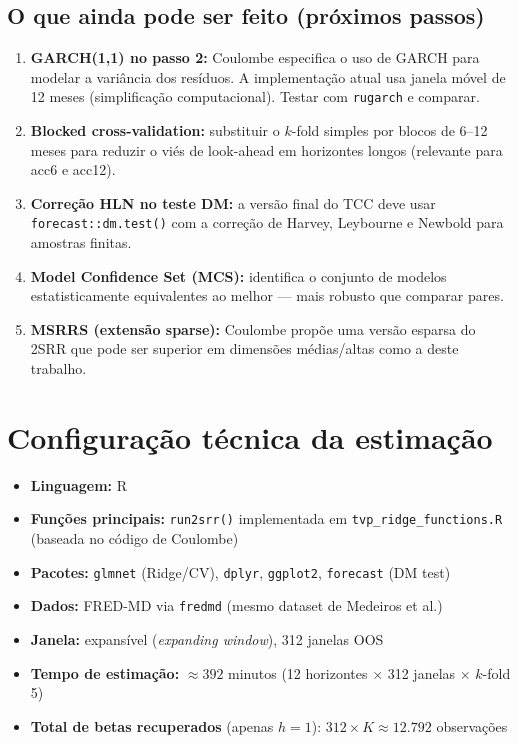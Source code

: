\documentclass[12pt, a4paper]{article}
\begin{document}
\subsection{O que ainda pode ser feito (próximos passos)}

\begin{enumerate}[leftmargin=*, label=\textbf{\arabic*.}]
  \item \textbf{GARCH(1,1) no passo 2:} Coulombe especifica o uso
    de GARCH para modelar a variância dos resíduos. A implementação
    atual usa janela móvel de 12 meses (simplificação computacional).
    Testar com \texttt{rugarch} e comparar.

  \item \textbf{Blocked cross-validation:} substituir o $k$-fold
    simples por blocos de 6--12 meses para reduzir o viés de
    look-ahead em horizontes longos (relevante para acc6 e acc12).

  \item \textbf{Correção HLN no teste DM:} a versão final do TCC
    deve usar \texttt{forecast::dm.test()} com a correção de
    Harvey, Leybourne e Newbold para amostras finitas.

  \item \textbf{Model Confidence Set (MCS):} identifica o conjunto
    de modelos estatisticamente equivalentes ao melhor --- mais
    robusto que comparar pares.

  \item \textbf{MSRRS (extensão sparse):} Coulombe propõe uma
    versão esparsa do 2SRR que pode ser superior em
    dimensões médias/altas como a deste trabalho.
\end{enumerate}

\section{Configuração técnica da estimação}
\label{sec:tecnico}

\begin{itemize}
  \item \textbf{Linguagem:} R
  \item \textbf{Funções principais:} \texttt{run2srr()} implementada
    em \texttt{tvp\_ridge\_functions.R} (baseada no código de
    Coulombe)
  \item \textbf{Pacotes:} \texttt{glmnet} (Ridge/CV), \texttt{dplyr},
    \texttt{ggplot2}, \texttt{forecast} (DM test)
  \item \textbf{Dados:} FRED-MD via \texttt{fredmd} (mesmo dataset
    de Medeiros et al.)
  \item \textbf{Janela:} expansível (\textit{expanding window}),
    312 janelas OOS
  \item \textbf{Tempo de estimação:} $\approx 392$ minutos
    (12 horizontes $\times$ 312 janelas $\times$ $k$-fold 5)
  \item \textbf{Total de betas recuperados} (apenas $h=1$):
    $312 \times K \approx 12.792$ observações
\end{itemize}

\end{document}
